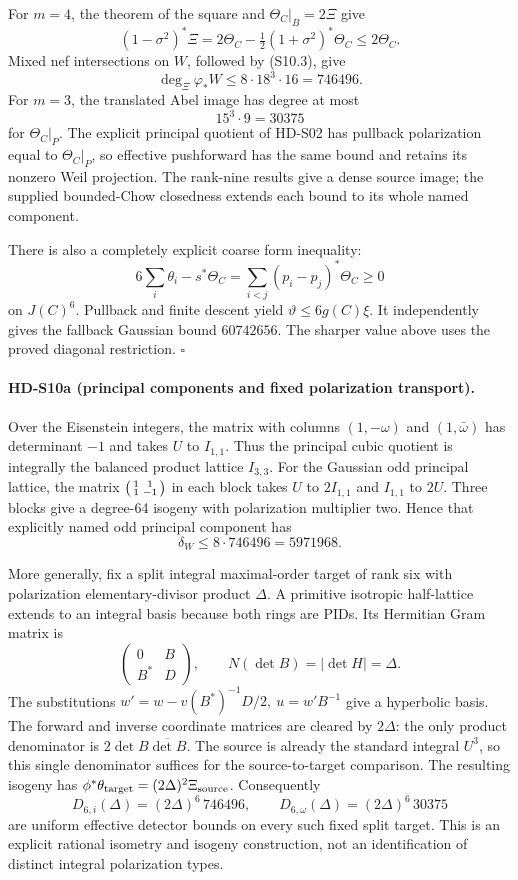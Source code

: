 For \(m=4\), the theorem of the square and
\(\Theta_C|_B=2\Xi\) give
\[
(1-\sigma^2)^*\Xi
=2\Theta_C-\tfrac12(1+\sigma^2)^*\Theta_C\le2\Theta_C.
\]
Mixed nef intersections on \(W\), followed by (S10.3), give
\[
\deg_\Xi\varphi_*W\le8\cdot18^3\cdot16=746496.
\]
For \(m=3\), the translated Abel image has degree at most
\[
15^3\cdot9=30375
\]
for \(\Theta_C|_P\). The explicit principal quotient of HD-S02 has
pullback polarization equal to \(\Theta_C|_P\), so effective pushforward
has the same bound and retains its nonzero Weil projection.
The rank-nine results give a dense source image; the supplied
bounded-Chow closedness extends each bound to its whole named component.

There is also a completely explicit coarse form inequality:
\[
6\sum_i\theta_i-s^*\Theta_C
=\sum_{i<j}(p_i-p_j)^*\Theta_C\ge0
\]
on \(J(C)^6\). Pullback and finite descent yield
\(\vartheta\le6g(C)\xi\).
It independently gives the fallback Gaussian bound \(60742656\).
The sharper value above uses the proved diagonal restriction. \(\square\)

\paragraph{HD-S10a (principal components and fixed polarization transport).}
Over the Eisenstein integers, the matrix with columns
\((1,-\omega)\) and \((1,\bar\omega)\) has determinant \(-1\) and
takes \(U\) to \(I_{1,1}\). Thus the principal cubic quotient is
integrally the balanced product lattice \(I_{3,3}\).
For the Gaussian odd principal lattice, the matrix
\(\begin{psmallmatrix}1&1\\1&-1\end{psmallmatrix}\) in each block
takes \(U\) to \(2I_{1,1}\) and \(I_{1,1}\) to \(2U\).
Three blocks give a degree-64 isogeny with polarization multiplier two.
Hence that explicitly named odd principal component has
\[
\delta_W\le8\cdot746496=5971968.
\]

More generally, fix a split integral maximal-order target of rank six
with polarization elementary-divisor product \(\Delta\).
A primitive isotropic half-lattice extends to an integral basis because
both rings are PIDs. Its Hermitian Gram matrix is
\[
\begin{pmatrix}0&B\\B^*&D\end{pmatrix},\qquad
N(\det B)=|\det H|=\Delta.
\]
The substitutions
\(w'=w-v(B^*)^{-1}D/2,\ u=w'B^{-1}\)
give a hyperbolic basis. The forward and inverse coordinate matrices
are cleared by \(2\Delta\): the only product denominator is
\(2\det B\overline{\det B}\).
The source is already the standard integral \(U^3\), so this single
denominator suffices for the source-to-target comparison.
The resulting isogeny has
\(\phi^*\theta_{\rm target}=(2\Delta)^2\Xi_{\rm source}\).
Consequently
\[
 D_{6,i}(\Delta)=(2\Delta)^6\,746496,\qquad
 D_{6,\omega}(\Delta)=(2\Delta)^6\,30375                      \tag{S10.4}
\]
are uniform effective detector bounds on every such fixed split target.
This is an explicit rational isometry and isogeny construction, not
an identification of distinct integral polarization types.

